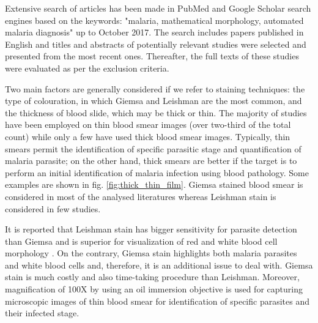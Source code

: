 \documentclass[sensors,review,submit,moreauthors,pdftex,10pt,a4paper]{mdpi}
\begin{document}
Extensive search of articles has been made in PubMed and Google Scholar search engines based on the keywords: "malaria, mathematical morphology, automated malaria diagnosis" up to October  2017. The search includes papers published in English and titles and abstracts of potentially relevant studies were selected and presented from the most recent ones. Thereafter, the full texts of these studies were evaluated as per the exclusion criteria.


Two main factors are generally considered if we refer to staining techniques: the type of colouration, in which Giemsa and Leishman are the most common, and the thickness of blood slide, which may be thick or thin.
The majority of studies have been employed on thin blood smear images (over two-third of the total count) while only a few have used thick blood smear images.
Typically, thin smears permit the identification of specific parasitic stage and quantification of malaria parasite; on the other hand, thick smears are better if the target is to perform an initial identification of malaria infection using blood pathology. Some examples are shown in fig. \ref{fig:thick_thin_film}.
Giemsa stained blood smear is considered in most of the analysed literatures whereas Leishman stain is considered in few studies. %

It is reported that Leishman stain has bigger sensitivity for parasite detection than Giemsa \cite{Khan2014} and is superior for visualization of red and white blood cell morphology \cite{Sathpathi2014}. On the contrary, Giemsa stain highlights both malaria parasites and white blood cells and, therefore, it is an additional issue to deal with.
Giemsa stain is much costly and also time-taking procedure than Leishman.
Moreover, magnification of 100X by using an oil immersion objective is used for capturing microscopic images of thin blood smear for identification of specific parasites and their infected stage.
\end{document}
